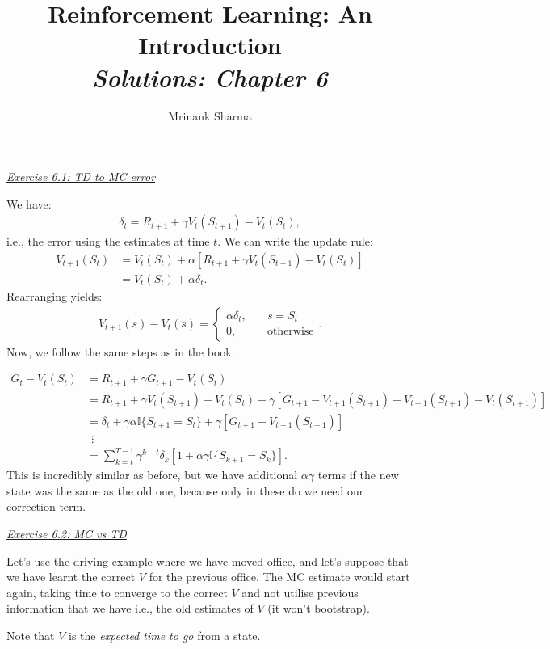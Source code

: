 \documentclass{article}
\title{\textbf{Reinforcement Learning: An Introduction}\\
\textit{Solutions: Chapter 6}
}
\author{Mrinank Sharma}
\newcommand{\myq}[1]{%
	\vspace{1em}
	\noindent\underline{\emph{Exercise #1}}\vspace{0.25em}\linebreak
}
\begin{document}
\maketitle

\myq{6.1: TD to MC error}
We have:
\begin{align}
\delta_t = R_{t+1} + \gamma V_t(S_{t+1}) - V_t(S_t),
\end{align} 
i.e., the error using the estimates at time $t$. We can write the update rule:
\begin{align}
V_{t+1}(S_t) &= V_{t}(S_t) + \alpha [R_{t+1} + \gamma V_{t}(S_{t+1}) - V_t(S_t)] \nonumber \\
&= V_t(S_t) + \alpha \delta_t.
\end{align}
Rearranging yields:
\begin{align}
V_{t+1}(s) - V_t(s) = \begin{cases}
\alpha \delta_t, \quad &s = S_t \\
0, & \text{otherwise}
\end{cases}.
\end{align}
Now, we follow the same steps as in the book. 

\begin{align}
G_t - V_t(S_t) &= R_{t+1} + \gamma G_{t+1} - V_t(S_t) \nonumber \\
&= R_{t+1} + \gamma V_t(S_{t+1}) - V_t(S_t) + \gamma [G_{t+1} - V_{t+1}(S_{t+1}) + V_{t+1}(S_{t+1}) - V_{t}(S_{t+1}) ] \nonumber \\
&= \delta_t + \gamma \alpha \mathbb{I} \lbrace S_{t+1} = S_t\rbrace + \gamma [G_{t+1} - V_{t+1}(S_{t+1})] \nonumber \\
&\ \ \vdots \nonumber \\
&=\sum_{k=t}^{T-1} \gamma^{k-t} \delta_k [1 + \alpha \gamma \mathbb{I} \lbrace S_{k+1} = S_k\rbrace ].
\end{align}
This is incredibly similar as before, but we have additional $\alpha \gamma$ terms if the new state was the same as the old one, because only in these do we need our correction term. 

\myq{6.2: MC vs TD}
Let's use the driving example where we have moved office, and let's suppose that we have learnt the correct $V$ for the previous office. The MC estimate would start again, taking time to converge to the correct $V$ and not utilise previous information that we have i.e., the old estimates of $V$ (it won't bootstrap). 

Note that $V$ is the \emph{expected time to go} from a state. 
\end{document}
